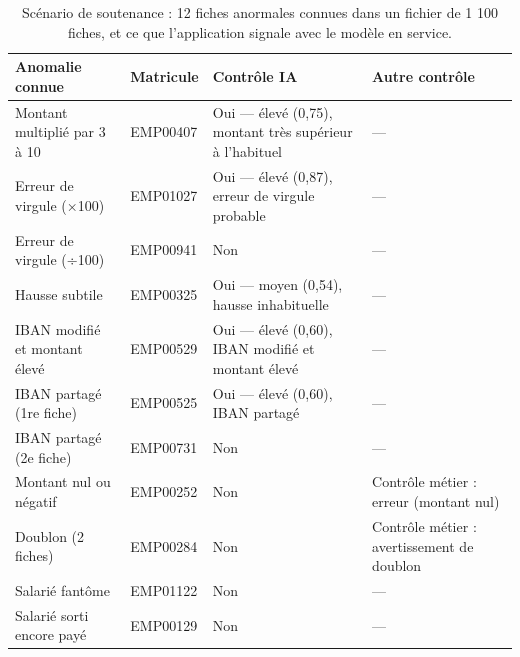 \begin{table}[htbp]
\centering
\caption{Scénario de soutenance : 12 fiches anormales connues dans un fichier de 1 100 fiches, et ce que l'application signale avec le modèle en service.}
\label{tab:scenario_soutenance}
\small
\begin{tabular}{p{3.8cm}lp{5cm}p{3.6cm}}
\toprule
\textbf{Anomalie connue} & \textbf{Matricule} & \textbf{Contrôle IA} & \textbf{Autre contrôle} \\
\midrule
Montant multiplié par 3 à 10 & EMP00407 & Oui — élevé (0,75), montant très supérieur à l'habituel & — \\
Erreur de virgule (×100) & EMP01027 & Oui — élevé (0,87), erreur de virgule probable & — \\
Erreur de virgule (÷100) & EMP00941 & Non & — \\
Hausse subtile & EMP00325 & Oui — moyen (0,54), hausse inhabituelle & — \\
IBAN modifié et montant élevé & EMP00529 & Oui — élevé (0,60), IBAN modifié et montant élevé & — \\
IBAN partagé (1re fiche) & EMP00525 & Oui — élevé (0,60), IBAN partagé & — \\
IBAN partagé (2e fiche) & EMP00731 & Non & — \\
Montant nul ou négatif & EMP00252 & Non & Contrôle métier : erreur (montant nul) \\
Doublon (2 fiches) & EMP00284 & Non & Contrôle métier : avertissement de doublon \\
Salarié fantôme & EMP01122 & Non & — \\
Salarié sorti encore payé & EMP00129 & Non & — \\
\bottomrule
\end{tabular}
\end{table}
